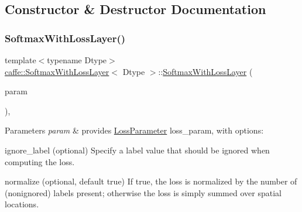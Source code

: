 \subsection{Constructor \& Destructor Documentation}
\mbox{\label{classcaffe_1_1_softmax_with_loss_layer_ac3a01d6846a9b62c1790635d53185e81}} 
\subsubsection{\texorpdfstring{Softmax\+With\+Loss\+Layer()}{SoftmaxWithLossLayer()}\hspace{0.1cm}{\footnotesize\ttfamily [1/2]}}
{\footnotesize\ttfamily template$<$typename Dtype$>$ \\
\mbox{\hyperlink{classcaffe_1_1_softmax_with_loss_layer}{caffe\+::\+Softmax\+With\+Loss\+Layer}}$<$ Dtype $>$\+::\mbox{\hyperlink{classcaffe_1_1_softmax_with_loss_layer}{Softmax\+With\+Loss\+Layer}} (\begin{DoxyParamCaption}\item[{const \mbox{\hyperlink{classcaffe_1_1_layer_parameter}{Layer\+Parameter}} \&}]{param }\end{DoxyParamCaption})\hspace{0.3cm}{\ttfamily [inline]}, {\ttfamily [explicit]}}


\begin{DoxyParams}{Parameters}
{\em param} & provides \mbox{\hyperlink{classcaffe_1_1_loss_parameter}{Loss\+Parameter}} loss\+\_\+param, with options\+:
\begin{DoxyItemize}
\item ignore\+\_\+label (optional) Specify a label value that should be ignored when computing the loss.
\item normalize (optional, default true) If true, the loss is normalized by the number of (nonignored) labels present; otherwise the loss is simply summed over spatial locations. 
\end{DoxyItemize}\\
\hline
\end{DoxyParams}
\mbox{\label{classcaffe_1_1_softmax_with_loss_layer_ac3a01d6846a9b62c1790635d53185e81}} 
